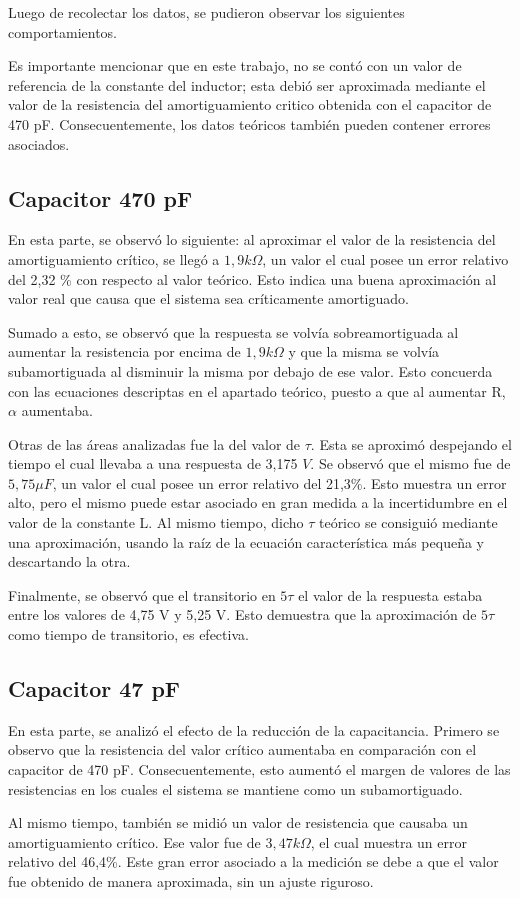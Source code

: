 \documentclass{article}
\begin{document}
    	Luego de recolectar los datos, se pudieron observar los siguientes comportamientos. \par
	Es importante mencionar que en este trabajo, no se contó con un valor de referencia de la constante del inductor; esta debió ser aproximada mediante el valor de la resistencia del amortiguamiento critico obtenida con el capacitor de 470 pF. Consecuentemente, los datos teóricos también pueden contener errores asociados.
	
        \subsection*{Capacitor 470 pF}
        	En esta parte, se observó lo siguiente: al aproximar el valor de la resistencia del amortiguamiento crítico, se llegó a $1,9 k\Omega$, un valor el cual posee un error relativo del 2,32 \% con respecto al valor teórico. Esto indica una buena aproximación al valor real que causa que el sistema sea críticamente amortiguado. \par
	Sumado a esto, se observó que la respuesta se volvía sobreamortiguada al aumentar la resistencia por encima de $1,9 k\Omega$ y que la misma se volvía subamortiguada al disminuir la misma por debajo de ese valor. Esto concuerda con las ecuaciones descriptas en el apartado teórico, puesto a que al aumentar R, $\alpha$ aumentaba. \par
	Otras de las áreas analizadas fue la del valor de $\tau$. Esta se aproximó despejando el tiempo el cual llevaba a una respuesta de 3,175 $V$. Se observó que el mismo fue de $5,75 \mu F$, un valor el cual posee un error relativo del 21,3\%. Esto muestra un error alto, pero el mismo puede estar asociado en gran medida a la incertidumbre en el valor de la constante L. Al mismo tiempo, dicho $\tau$ teórico se consiguió mediante una aproximación, usando la raíz de la ecuación característica más pequeña y descartando la otra.\par
	Finalmente, se observó que el transitorio en $5\tau$ el valor de la respuesta estaba entre los valores de 4,75 V y 5,25 V. Esto demuestra que la aproximación de $5\tau$ como tiempo de transitorio, es efectiva.
	
	
        \subsection*{Capacitor 47 pF}
        En esta parte, se analizó el efecto de la reducción de la capacitancia. Primero se observo que la resistencia del valor crítico aumentaba en comparación con el capacitor de 470 pF. Consecuentemente, esto aumentó el margen de valores de las resistencias en los cuales el sistema se mantiene como un subamortiguado.\par
        Al mismo tiempo, también se midió un valor de resistencia que causaba un amortiguamiento crítico. Ese valor fue de $3,47 k\Omega$, el cual muestra un error relativo del 46,4\%. Este gran error asociado a la medición se debe a que el valor fue obtenido de manera aproximada, sin un ajuste riguroso.\par 
        
\end{document}
